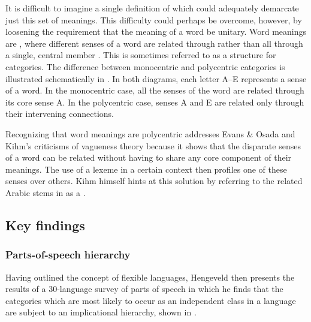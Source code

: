
It is difficult to imagine a single definition of  which could adequately demarcate just this set of meanings. This difficulty could perhaps be overcome, however, by loosening the requirement that the meaning of a word be unitary. Word meanings are , where different senses of a word are related through  rather than all through a single, central member \parencite[110]{Taylor2003}. This is sometimes referred to as a  structure for categories. The difference between monocentric and polycentric categories is illustrated schematically in . In both diagrams, each letter A–E represents a sense of a word. In the monocentric case, all the senses of the word are related through its core sense A. In the polycentric case, senses A and E are related only through their intervening connections.


Recognizing that word meanings are polycentric addresses Evans \& Osada and Kihm's criticisms of vagueness theory because it shows that the disparate senses of a word can be related without having to share any core component of their meanings. The use of a lexeme in a certain context then profiles one of these senses over others. Kihm himself hints at this solution by referring to the related Arabic stems in  as a .

\subsection{Key findings}
\label{sec:2.3.2}

\subsubsection{Parts-of-speech hierarchy}
\label{sec:2.3.2.1}

Having outlined the concept of flexible languages, Hengeveld then presents the results of a 30-language survey of parts of speech in which he finds that the categories which are most likely to occur as an independent class in a language are subject to an implicational hierarchy, shown in .

